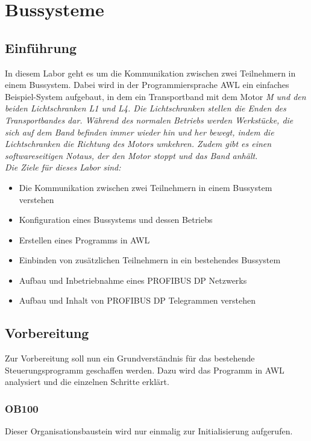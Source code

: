 \documentclass{report}
\begin{document}
\newpage

\tableofcontents

\listoffigures

\newpage

\chapter{Bussysteme}

\section{Einführung}
\label{sec:einfuhrung}

In diesem Labor geht es um die Kommunikation zwischen zwei Teilnehmern in einem Bussystem. Dabei wird in der Programmiersprache AWL ein einfaches Beispiel-System aufgebaut, in dem ein Transportband mit dem Motor \it{M} und den beiden Lichtschranken \it{L1} und \it{L4}. Die Lichtschranken stellen die Enden des Transportbandes dar. Während des normalen Betriebs werden Werkstücke, die sich auf dem Band befinden immer wieder hin und her bewegt, indem die Lichtschranken die Richtung des Motors umkehren. Zudem gibt es einen softwareseitigen Notaus, der den Motor stoppt und das Band anhält.\\
Die Ziele für dieses Labor sind: 
\begin{itemize}
    \item Die Kommunikation zwischen zwei Teilnehmern in einem Bussystem verstehen
    \item Konfiguration eines Bussystems und dessen Betriebs
    \item Erstellen eines Programms in AWL
    \item Einbinden von zusätzlichen Teilnehmern in ein bestehendes Bussystem
    \item Aufbau und Inbetriebnahme eines PROFIBUS DP Netzwerks
    \item Aufbau und Inhalt von PROFIBUS DP Telegrammen verstehen
\end{itemize}

\section{Vorbereitung}
Zur Vorbereitung soll nun ein Grundverständnis für das bestehende Steuerungsprogramm geschaffen werden. Dazu wird das Programm in AWL analysiert und die einzelnen Schritte erklärt.

\subsection{OB100}
\label{sec:ob100}
Dieser Organisationsbaustein wird nur einmalig zur Initialisierung aufgerufen.
\end{document}
